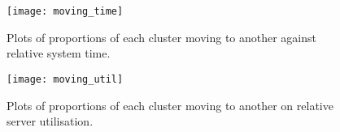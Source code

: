 \begin{figure}
    \centering
    \texttt{[image: moving\_time]}
    \caption{%
        Plots of proportions of each cluster moving to another against relative
        system time.
    }\label{fig:moving_time}
\end{figure}

\begin{figure}
    \centering
    \texttt{[image: moving\_util]}
    \caption{%
        Plots of proportions of each cluster moving to another on relative
        server utilisation.
    }\label{fig:moving_util}
\end{figure}
